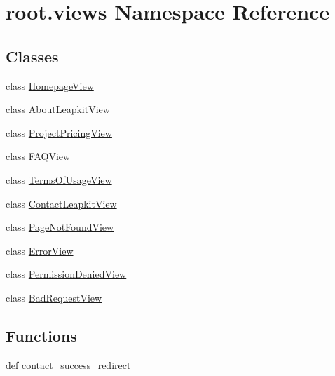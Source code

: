 \hypertarget{namespaceroot_1_1views}{\section{root.\-views Namespace Reference}
\label{namespaceroot_1_1views}
}
\subsection*{Classes}
\begin{DoxyCompactItemize}
\item 
class \hyperlink{classroot_1_1views_1_1_homepage_view}{Homepage\-View}
\item 
class \hyperlink{classroot_1_1views_1_1_about_leapkit_view}{About\-Leapkit\-View}
\item 
class \hyperlink{classroot_1_1views_1_1_project_pricing_view}{Project\-Pricing\-View}
\item 
class \hyperlink{classroot_1_1views_1_1_f_a_q_view}{F\-A\-Q\-View}
\item 
class \hyperlink{classroot_1_1views_1_1_terms_of_usage_view}{Terms\-Of\-Usage\-View}
\item 
class \hyperlink{classroot_1_1views_1_1_contact_leapkit_view}{Contact\-Leapkit\-View}
\item 
class \hyperlink{classroot_1_1views_1_1_page_not_found_view}{Page\-Not\-Found\-View}
\item 
class \hyperlink{classroot_1_1views_1_1_error_view}{Error\-View}
\item 
class \hyperlink{classroot_1_1views_1_1_permission_denied_view}{Permission\-Denied\-View}
\item 
class \hyperlink{classroot_1_1views_1_1_bad_request_view}{Bad\-Request\-View}
\end{DoxyCompactItemize}
\subsection*{Functions}
\begin{DoxyCompactItemize}
\item 
def \hyperlink{namespaceroot_1_1views_a1070581fb0146e84a45c8c8d3e9a5349}{contact\-\_\-success\-\_\-redirect}
\end{DoxyCompactItemize}


